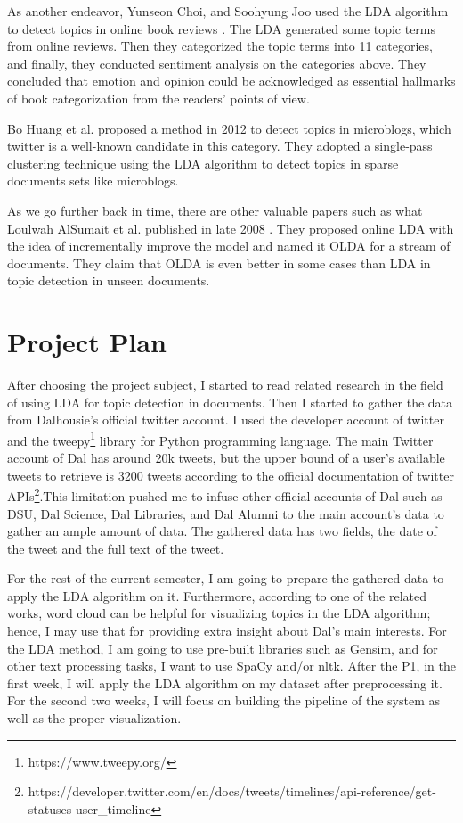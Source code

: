 \documentclass[11pt,titlepage]{article}
\begin{document}
As another endeavor, Yunseon Choi, and Soohyung Joo used the LDA algorithm to detect topics in online book reviews \cite{8791161}. The LDA generated some topic terms from online reviews. Then they categorized the topic terms into 11 categories, and finally, they conducted sentiment analysis on the categories above. They concluded that emotion and opinion could be acknowledged as essential hallmarks of book categorization from the readers' points of view.

Bo Huang et al. proposed a method\cite{10.1007/978-3-642-32115-3_19} in 2012 to detect topics in microblogs, which twitter is a well-known candidate in this category. They adopted a single-pass clustering technique using the LDA algorithm to detect topics in sparse documents sets like microblogs.

As we go further back in time, there are other valuable papers such as what Loulwah AlSumait et al. published in late 2008 \cite{4781095}. They proposed online LDA with the idea of incrementally improve the model and named it OLDA for a stream of documents. They claim that OLDA is even better in some cases than LDA in topic detection in unseen documents.

\section{Project Plan}

After choosing the project subject, I started to read related research in the field of using LDA for topic detection in documents. Then I started to gather the data from Dalhousie's official twitter account. I used the developer account of twitter and the tweepy\footnote{https://www.tweepy.org/} library for Python programming language. The main Twitter account of Dal has around 20k tweets, but the upper bound of a user's available tweets to retrieve is 3200 tweets according to the official documentation of twitter APIs\footnote{https://developer.twitter.com/en/docs/tweets/timelines/api-reference/get-statuses-user\_timeline}.This limitation pushed me to infuse other official accounts of Dal such as DSU, Dal Science, Dal Libraries, and Dal Alumni to the main account's data to gather an ample amount of data. The gathered data has two fields, the date of the tweet and the full text of the tweet.

For the rest of the current semester, I am going to prepare the gathered data to apply the LDA algorithm on it. Furthermore, according to one of the related works\cite{unankard2019topic}, word cloud can be helpful for visualizing topics in the LDA algorithm; hence, I may use that for providing extra insight about Dal's main interests. For the LDA method, I am going to use pre-built libraries such as Gensim, and for other text processing tasks, I want to use SpaCy and/or nltk. After the P1, in the first week, I will apply the LDA algorithm on my dataset after preprocessing it. For the second two weeks, I will focus on building the pipeline of the system as well as the proper visualization. 
 


\end{document}
